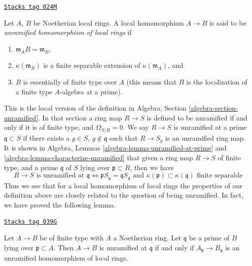 \begin{definition}
\label{etale-definition-unramified-rings}
\href{https://stacks.math.columbia.edu/tag/024M}{\texttt{Stacks tag 024M}}

Let $A$, $B$ be Noetherian local rings. A local homomorphism $A \to B$
is said to be {\it unramified homomorphism of local rings} if
\begin{enumerate}
\item $\mathfrak m_AB = \mathfrak m_B$,
\item $\kappa(\mathfrak m_B)$ is a finite separable extension of
$\kappa(\mathfrak m_A)$, and
\item $B$ is essentially of finite type over $A$ (this means
that $B$ is the localization of a finite type $A$-algebra at a prime).
\end{enumerate}
\end{definition}

This is the local version of the
definition in Algebra, Section \ref{algebra-section-unramified}.
In that section a ring map $R \to S$ is defined to be unramified if and
only if it is of finite type, and $\Omega_{S/R} = 0$.
We say $R \to S$ is unramified at a prime $\mathfrak q \subset S$
if there exists a $g \in S$, $g \not \in \mathfrak q$ such that
$R \to S_g$ is an unramified ring map. It is shown in
Algebra, Lemmas \ref{algebra-lemma-unramified-at-prime} and
\ref{algebra-lemma-characterize-unramified} that given a ring
map $R \to S$ of finite type, and a prime $\mathfrak q$ of $S$
lying over $\mathfrak p \subset R$, then we have
$$
R \to S\text{ is unramified at }\mathfrak q
\Leftrightarrow
\mathfrak pS_{\mathfrak q} = \mathfrak q S_{\mathfrak q}
\text{ and }
\kappa(\mathfrak p) \subset \kappa(\mathfrak q)\text{ finite separable}
$$
Thus we see that for a local homomorphism of local rings the properties
of our definition above are closely related to the question of
being unramified. In fact, we have proved the following lemma.

\begin{lemma}
\label{etale-lemma-characterize-unramified-Noetherian}
\href{https://stacks.math.columbia.edu/tag/039G}{\texttt{Stacks tag 039G}}


Let $A \to B$ be of finite type with $A$ a Noetherian ring.
Let $\mathfrak q$ be a prime of $B$ lying over $\mathfrak p \subset A$.
Then $A \to B$ is unramified at $\mathfrak q$ if and only if
$A_{\mathfrak p} \to B_{\mathfrak q}$ is an unramified homomorphism
of local rings.
\end{lemma}


